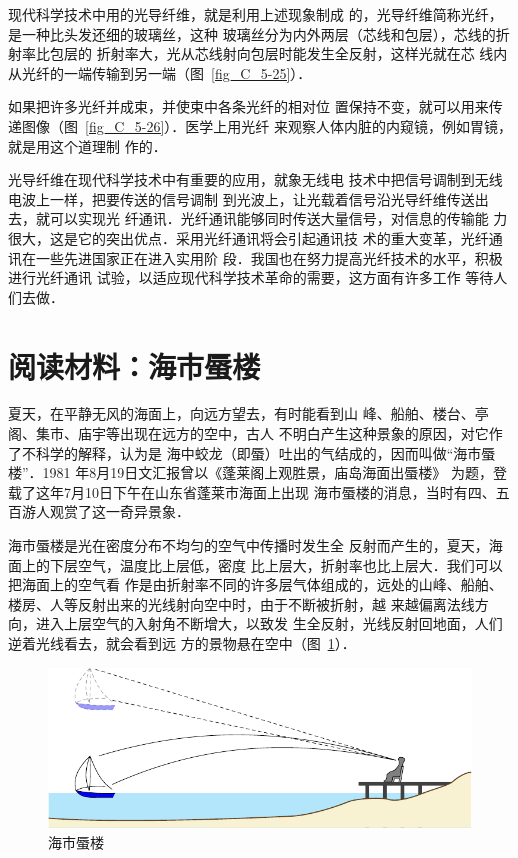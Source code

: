 现代科学技术中用的光导纤维，就是利用上述现象制成
的，光导纤维简称光纤，是一种比头发还细的玻璃丝，这种
玻璃丝分为内外两层（芯线和包层），芯线的折射率比包层的
折射率大，光从芯线射向包层时能发生全反射，这样光就在芯
线内从光纤的一端传输到另一端（图~\ref{fig_C_5-25}）．


如果把许多光纤并成束，并使束中各条光纤的相对位
置保持不变，就可以用来传递图像（图~\ref{fig_C_5-26}）．医学上用光纤
来观察人体内脏的内窥镜，例如胃镜，就是用这个道理制
作的．

光导纤维在现代科学技术中有重要的应用，就象无线电
技术中把信号调制到无线电波上一样，把要传送的信号调制
到光波上，让光载着信号沿光导纤维传送出去，就可以实现光
纤通讯．光纤通讯能够同时传送大量信号，对信息的传输能
力很大，这是它的突出优点．采用光纤通讯将会引起通讯技
术的重大变革，光纤通讯在一些先进国家正在进入实用阶
段．我国也在努力提高光纤技术的水平，积极进行光纤通讯
试验，以适应现代科学技术革命的需要，这方面有许多工作
等待人们去做．

\section*{阅读材料：海市蜃楼}

夏天，在平静无风的海面上，向远方望去，有时能看到山
峰、船舶、楼台、亭阁、集市、庙宇等出现在远方的空中，古人
不明白产生这种景象的原因，对它作了不科学的解释，认为是
海中蛟龙（即蜃）吐出的气结成的，因而叫做“海市蜃楼”．1981
年8月19日文汇报曾以《蓬莱阁上观胜景，庙岛海面出蜃楼》
为题，登载了这年7月10日下午在山东省蓬莱市海面上出现
海市蜃楼的消息，当时有四、五百游人观赏了这一奇异景象．

海市蜃楼是光在密度分布不均匀的空气中传播时发生全
反射而产生的，夏天，海面上的下层空气，温度比上层低，密度
比上层大，折射率也比上层大．我们可以把海面上的空气看
作是由折射率不同的许多层气体组成的，远处的山峰、船舶、
楼房、人等反射出来的光线射向空中时，由于不断被折射，越
来越偏离法线方向，进入上层空气的入射角不断增大，以致发
生全反射，光线反射回地面，人们逆着光线看去，就会看到远
方的景物悬在空中（图~\ref{fig_C_5-27}）．
\begin{figure}[htbp]
    \centering
    \includegraphics{fig/C/5-27.pdf}
    \caption{海市蜃楼}\label{fig_C_5-27}
\end{figure}

